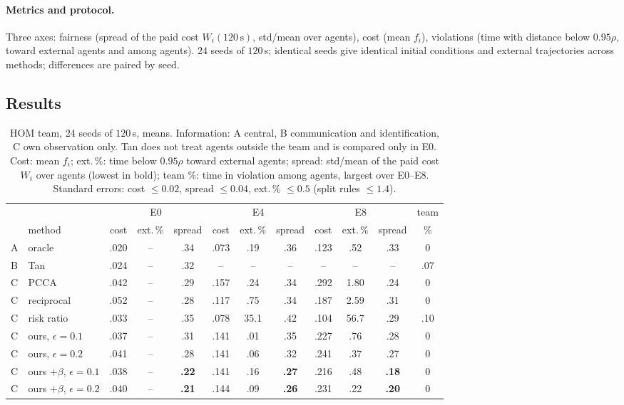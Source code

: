 \documentclass[11pt]{article}
\theoremstyle{definition}
\theoremstyle{remark}
\begin{document}
\paragraph{Metrics and protocol.} Three axes: fairness (spread of the paid cost $W_i(120\,\mathrm s)$, std/mean over agents), cost (mean $f_i$), violations (time with distance below $0.95\rho$, toward external agents and among agents). $24$ seeds of $120$\,s; identical seeds give identical initial conditions and external trajectories across methods; differences are paired by seed.

\subsection{Results}\label{sec:prelim}
\begin{table}[h]
\centering\footnotesize\setlength{\tabcolsep}{3.2pt}
\begin{tabular}{llccccccccc c}
\toprule
 & & \multicolumn{3}{c}{E0} & \multicolumn{3}{c}{E4} & \multicolumn{3}{c}{E8} & team\\
\cmidrule(lr){3-5}\cmidrule(lr){6-8}\cmidrule(lr){9-11}
 & method & cost & ext.\,\% & spread & cost & ext.\,\% & spread & cost & ext.\,\% & spread & \%\\
\midrule
A & oracle & .020 & -- & .34 & .073 & .19 & .36 & .123 & .52 & .33 & 0\\
B & Tan & .024 & -- & .32 & -- & -- & -- & -- & -- & -- & .07\\
\midrule
C & PCCA & .042 & -- & .29 & .157 & .24 & .34 & .292 & 1.80 & .24 & 0\\
C & reciprocal & .052 & -- & .28 & .117 & .75 & .34 & .187 & 2.59 & .31 & 0\\
C & risk ratio & .033 & -- & .35 & .078 & 35.1 & .42 & .104 & 56.7 & .29 & .10\\
C & ours, $\epsilon=0.1$ & .037 & -- & .31 & .141 & .01 & .35 & .227 & .76 & .28 & 0\\
C & ours, $\epsilon=0.2$ & .041 & -- & .28 & .141 & .06 & .32 & .241 & .37 & .27 & 0\\
C & ours $+\beta$, $\epsilon=0.1$ & .038 & -- & \textbf{.22} & .141 & .16 & \textbf{.27} & .216 & .48 & \textbf{.18} & 0\\
C & ours $+\beta$, $\epsilon=0.2$ & .040 & -- & \textbf{.21} & .144 & .09 & \textbf{.26} & .231 & .22 & \textbf{.20} & 0\\
\bottomrule
\end{tabular}
\caption{HOM team, 24 seeds of $120$\,s, means. Information: A central, B communication and identification, C own observation only. Tan does not treat agents outside the team and is compared only in E0. Cost: mean $f_i$; ext.\,\%: time below $0.95\rho$ toward external agents; spread: std/mean of the paid cost $W_i$ over agents (lowest in bold); team \%: time in violation among agents, largest over E0--E8. Standard errors: cost $\le0.02$, spread $\le0.04$, ext.\,\% $\le0.5$ (split rules $\le1.4$).}
\label{tab:hom}
\end{table}
\end{document}
